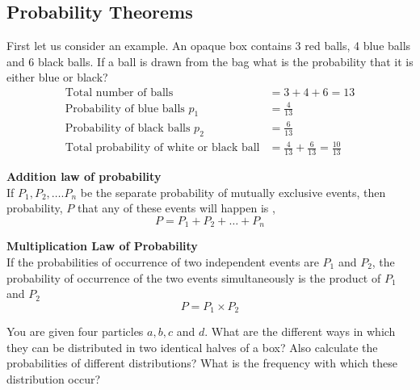 \subsection{Probability Theorems}

First let us consider an example. An opaque box contains 3 red balls, 4 blue balls and 6 black balls. If a ball is drawn from the bag what is the probability that it is either blue or black?
\begin{align*}
\text{Total number of balls}&=3+4+6=13\\
\text{Probability of blue balls $p_1$}&=\frac{4}{13}\\
\text{Probability of black balls $p_2$}&=\frac{6}{13}\\
\text{Total probability of white or black ball}&=\frac{4}{13}+\frac{6}{13}=\frac{10}{13}
\end{align*}
\begin{theorem}\textbf{Addition law of probability}\\
	If $P_{1}, P_{2}, \ldots . P_{n}$ be the separate probability of mutually exclusive events, then probability, $P$ that any of these events will happen is , $$P=P_{1}+P_{2}+\ldots+P_{n}$$
\end{theorem}
\begin{theorem}\textbf{Multiplication Law of Probability}\\
If the probabilities of occurrence of two independent events are $P_{1}$ and $P_{2}$, the probability of occurrence of the two events simultaneously is the product of $P_{1}$ and $P_{2}$
$$ P=P_{1} \times P_{2}$$
\end{theorem}
\begin{exercise}
	You are given four particles $a, b, c$ and $d$. What are the different ways in which they can be distributed in two identical halves of a box? Also calculate the probabilities of different distributions? What is the frequency with which these distribution occur?
\end{exercise}

